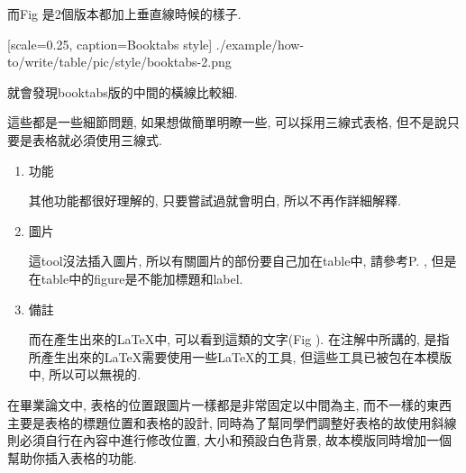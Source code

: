   而Fig 是2個版本都加上垂直線時候的樣子.

    {
      [scale=0.25,
      caption={Booktabs style}]
      {./example/how-to/write/table/pic/style/booktabs-2.png}
    }

  就會發現booktabs版的中間的橫線比較細.

  這些都是一些細節問題, 如果想做簡單明瞭一些, 可以採用三線式表格, 但不是說只要是表格就必須使用三線式.

{}

  \begin{enumerate}

  \item
  {
    功能

    其他功能都很好理解的, 只要嘗試過就會明白, 所以不再作詳細解釋.
  } %

  \item
  {
    圖片

    這tool沒法插入圖片, 所以有關圖片的部份要自己加在table中, 請參考P. , 但是在table中的figure是不能加標題和label.
  } %

  \item
  {
    備註

    而在產生出來的LaTeX中, 可以看到這類的文字(Fig ). 在注解中所講的, 是指所產生出來的LaTeX需要使用一些LaTeX的工具, 但這些工具已被包在本模版中, 所以可以無視的.

  } %
  \end{enumerate}

\newpage
{}

在畢業論文中, 表格的位置跟圖片一樣都是非常固定以中間為主, 而不一樣的東西主要是表格的標題位置和表格的設計, 同時為了幫同學們調整好表格的故使用斜線則必須自行在內容中進行修改位置, 大小和預設白色背景, 故本模版同時增加一個幫助你插入表格的功能.\\

